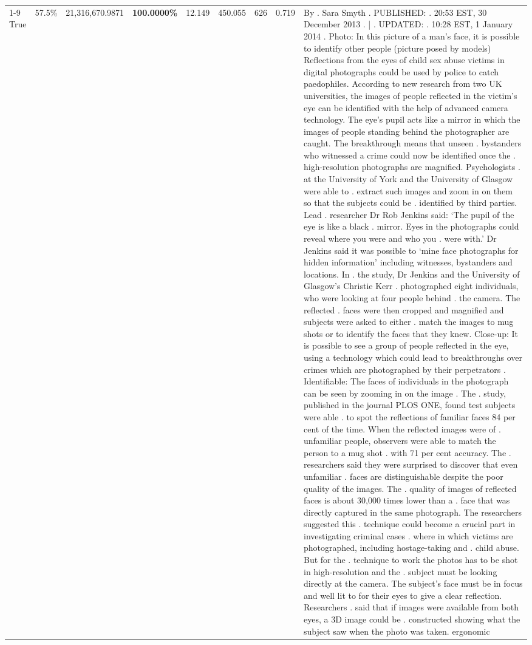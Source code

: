 \begin{table}[H]
\begin{tabular}{lllrlllll}
\cline{1-9}
True & 57.5\% & 21,316,670.9871 & \bfseries \color{red} 100.0000\% & 12.149 & 450.055 & 626 & 0.719 & By . Sara Smyth . PUBLISHED: . 20:53 EST, 30 December 2013 . | . UPDATED: . 10:28 EST, 1 January 2014 . Photo: In this picture of a man's face, it is possible to identify other people (picture posed by models) Reflections from the eyes of child sex abuse victims in digital photographs could be used by police to catch paedophiles. According to new research from two UK universities, the images of people reflected in the victim's eye can be identified with the help of advanced camera technology. The eye's pupil acts like a mirror in which the images of people standing behind the photographer are caught. The breakthrough means that unseen . bystanders who witnessed a crime could now be identified once the . high-resolution photographs are magnified. Psychologists . at the University of York and the University of Glasgow were able to . extract such images and zoom in on them so that the subjects could be . identified by third parties. Lead . researcher Dr Rob Jenkins said: ‘The pupil of the eye is like a black . mirror. Eyes in the photographs could reveal where you were and who you . were with.' Dr Jenkins said it was possible to ‘mine face photographs for hidden information' including witnesses, bystanders and locations. In . the study, Dr Jenkins and the University of Glasgow's Christie Kerr . photographed eight individuals, who were looking at four people behind . the camera. The reflected . faces were then cropped and magnified and subjects were asked to either . match the images to mug shots or to identify the faces that they knew. Close-up: It is possible to see a group of people reflected in the eye, using a technology which could lead to breakthroughs over crimes which are photographed by their perpetrators . Identifiable: The faces of individuals in the photograph can be seen by zooming in on the image . The . study, published in the journal PLOS ONE, found test subjects were able . to spot the reflections of familiar faces 84 per cent of the time. When the reflected images were of . unfamiliar people, observers were able to match the person to a mug shot . with 71 per cent accuracy. The . researchers said they were surprised to discover that even unfamiliar . faces are distinguishable despite the poor quality of the images. The . quality of images of reflected faces is about 30,000 times lower than a . face that was directly captured in the same photograph. The researchers suggested this . technique could become a crucial part in investigating criminal cases . where in which victims are photographed, including hostage-taking and . child abuse. But for the . technique to work the photos has to be shot in high-resolution and the . subject must be looking directly at the camera. The subject's face must be in focus and well lit to for their eyes to give a clear reflection. Researchers . said that if images were available from both eyes, a 3D image could be . constructed showing what the subject saw when the photo was taken. ergonomic \\

\end{tabular}
\end{table}
